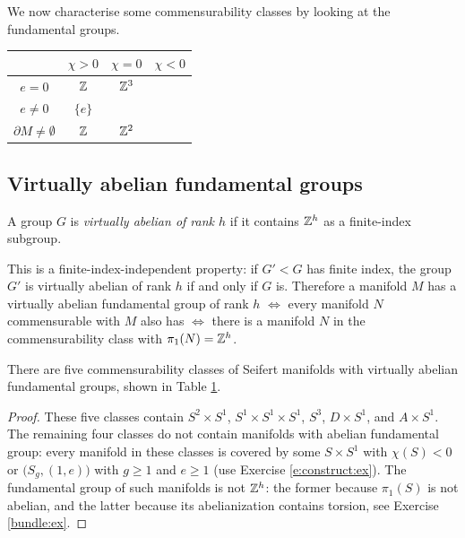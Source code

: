 We now characterise some commensurability classes by looking at the fundamental groups.

\begin{table}
\begin{center}
\begin{tabular}{c||ccc}
        & \phantom{\Big|} $\chi>0$ & $\chi = 0$ & $\chi<0$ \\
 \hline \hline
 $e=0$ & \phantom{\Big|} $\mathbb{Z}$ & $\mathbb{Z}^3$ & \\
 $e\neq 0$ & \phantom{\big|} $\{e\}$ & &  \\
 $\partial M\neq \emptyset$ & \phantom{\Big|} $\mathbb{Z}$ & $\mathbb{Z}^2$ &
\end{tabular}
\vspace{.2 cm}
\label{abelian:group:table}
\end{center}
\end{table}

\subsection{Virtually abelian fundamental groups} \label{virtually:abelian:subsection}
A group $G$ is \emph{virtually abelian of rank $h$} if it contains $\mathbb{Z}^h$ as a finite-index subgroup. 

This is a finite-index-independent property: if $G'<G$ has finite index, the group $G'$ is virtually abelian of rank $h$ if and only if $G$ is. Therefore a manifold $M$ has a virtually abelian fundamental group of rank $h$ $\Longleftrightarrow$ every manifold $N$ commensurable with $M$ also has $\Longleftrightarrow$ there is a manifold $N$ in the commensurability class with $\pi_1(N)=\mathbb{Z}^h$.

\begin{prop} \label{virtually:abelian:prop}
There are five commensurability classes of Seifert manifolds with virtually abelian fundamental groups, shown in Table \ref{abelian:group:table}.
\end{prop}
\begin{proof}
These five classes contain $S^2\times S^1$, $S^1\times S^1\times S^1$, $S^3$, $D\times S^1$, and $A\times S^1$. The remaining four classes do not contain manifolds with abelian fundamental group: every manifold in these classes is covered by some $S \times S^1$ with $\chi(S)<0$ or $\big(S_g, (1,e)\big)$ with $g\geqslant 1$ and $e\geqslant 1$ (use Exercise \ref{e:construct:ex}). The fundamental group of such manifolds is not $\mathbb{Z}^h$: the former because $\pi_1(S)$ is not abelian, and the latter because its abelianization contains torsion, see Exercise \ref{bundle:ex}.
\end{proof}

